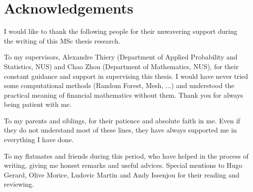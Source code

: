 \documentclass[english,11pt,openany]{report}
\theoremstyle{definition}
\theoremstyle{plain}
\theoremstyle{definition}
\newcommand\mysymbol[3]{%
	\protected\gdef#1{#2}%
	\item[$#2$]#3}
\begin{document}
\chapter*{Acknowledgements}

I would like to thank the following people for their unwavering support during the writing of this MSc thesis research. 
\newline 

To my supervisors, Alexandre Thiery (Department of Applied Probability and Statistics, NUS) and Chao Zhou (Department of Mathematics, NUS), for their constant guidance and support in supervising this thesis. I would have never tried some computational methods (Random Forest, Mesh, ...) and understood the practical meaning of financial mathematics without them. Thank you for always being patient with me. 
\newline

To my parents and siblings, for their patience and absolute faith in me. Even if they do not understand most of these lines, they have always supported me in everything I have done. 
\newline

To my flatmates and friends during this period, who have helped in the process of writing, giving me honest remarks and useful advices. Special mentions to Hugo Gerard, Olive Morice, Ludovic Martin and Andy Issenjou for their reading and reviewing. 

\thispagestyle{empty}
\newpage

\tableofcontents
\newpage

\listoftables
\newpage

\listoffigures
\newpage 

\end{document}
